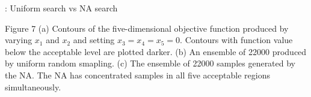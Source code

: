 

\begin{frame}[c]{\titleprefix: Uniform search vs NA search}

  \centering

  \begin{minipage}{0.5\textwidth}
  \end{minipage}
  \begin{minipage}{0.38\textwidth}
    \tiny
    \begin{figureblock}{Figure 7}
      (a) Contours of the five-dimensional objective function produced by
      varying $x_1$ and $x_2$ and setting $x_3 = x_4 = x_5 = 0$. Contours with
      function value below the acceptable level are plotted darker.
      (b) An ensemble of 22000 produced by uniform random smapling.
      (c) The ensemble of 22000 samples generated by the NA. The NA has
      concentrated samples in all five acceptable regions simultaneously.
    \end{figureblock}
  \end{minipage}

\end{frame}
